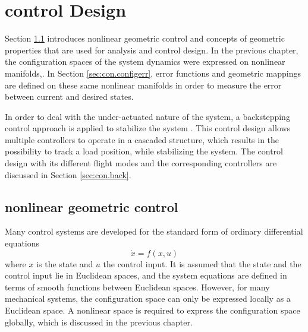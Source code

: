 \chapter{control Design} \label{ch:control}
Section \ref{sec:con.nlgc} introduces nonlinear geometric control and concepts of geometric properties that are used for analysis and control design.  
In the previous chapter, the configuration spaces of the system dynamics were expressed on nonlinear manifolds,.
In Section \ref{sec:con.configerr}, error functions and geometric mappings are defined on these same nonlinear manifolds in order to measure the error between current and desired states. 

In order to deal with the under-actuated nature of the system, a backstepping control approach is applied to stabilize the system .
This control design allows multiple controllers to operate in a cascaded structure, which results in the possibility to track a load position, while stabilizing the system.
The control design with its different flight modes and the corresponding controllers are discussed in Section \ref{sec:con.back}.




\newpage
\section{nonlinear geometric control}\label{sec:con.nlgc}
Many control systems are developed for the standard form of ordinary differential equations
\begin{equation}\label{key}
 \dot{x}=f(x,u) 
\end{equation}
where $ x $ is the state and $ u $ the control input. It is assumed that the state and the control input lie in Euclidean spaces, and the system equations are defined in terms of smooth functions between Euclidean spaces. However, for many mechanical systems, the configuration space can only be expressed locally as a Euclidean space. 
A nonlinear space is required to express the configuration space globally, which is discussed in the previous chapter.

